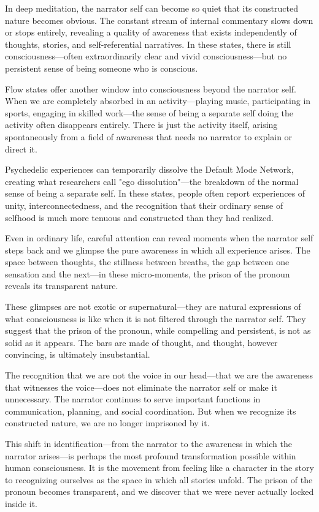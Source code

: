 In deep meditation, the narrator self can become so quiet that its constructed nature becomes obvious. The constant stream of internal commentary slows down or stops entirely, revealing a quality of awareness that exists independently of thoughts, stories, and self-referential narratives. In these states, there is still consciousness—often extraordinarily clear and vivid consciousness—but no persistent sense of being someone who is conscious.

Flow states offer another window into consciousness beyond the narrator self. When we are completely absorbed in an activity—playing music, participating in sports, engaging in skilled work—the sense of being a separate self doing the activity often disappears entirely. There is just the activity itself, arising spontaneously from a field of awareness that needs no narrator to explain or direct it.

Psychedelic experiences can temporarily dissolve the Default Mode Network, creating what researchers call "ego dissolution"—the breakdown of the normal sense of being a separate self. In these states, people often report experiences of unity, interconnectedness, and the recognition that their ordinary sense of selfhood is much more tenuous and constructed than they had realized.

Even in ordinary life, careful attention can reveal moments when the narrator self steps back and we glimpse the pure awareness in which all experience arises. The space between thoughts, the stillness between breaths, the gap between one sensation and the next—in these micro-moments, the prison of the pronoun reveals its transparent nature.

These glimpses are not exotic or supernatural—they are natural expressions of what consciousness is like when it is not filtered through the narrator self. They suggest that the prison of the pronoun, while compelling and persistent, is not as solid as it appears. The bars are made of thought, and thought, however convincing, is ultimately insubstantial.

The recognition that we are not the voice in our head—that we are the awareness that witnesses the voice—does not eliminate the narrator self or make it unnecessary. The narrator continues to serve important functions in communication, planning, and social coordination. But when we recognize its constructed nature, we are no longer imprisoned by it.

This shift in identification—from the narrator to the awareness in which the narrator arises—is perhaps the most profound transformation possible within human consciousness. It is the movement from feeling like a character in the story to recognizing ourselves as the space in which all stories unfold. The prison of the pronoun becomes transparent, and we discover that we were never actually locked inside it.


